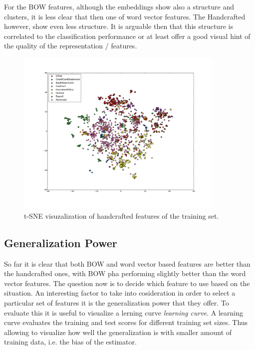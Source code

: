For the \ac{BOW} features, although the embeddings show also a  structure
and clusters, it  is less clear that then one of word vector features. The
Handcrafted however, show even less structure. It is arguable then that this
structure is correlated to the classification performance or at least offer a
good visual hint of the quality of the representation / features. 


\begin{figure}[ht!]
	\begin{center}

			\includegraphics[width=10cm]{images/tse-handcrafted-vectors.pdf} 

	\end{center}
        \caption{\ac{t-SNE} visuzalization of handcrafted features of the training set.}
	\label{fig:tsne_viz_3}
\end{figure}
 

\subsection{Generalization Power}
\label{sec:sub_w2v4tc_gen_power}

So far it is clear that both \ac{BOW} and word vector based features are
better than the handcrafted ones, with \ac{BOW}  pha performing slightly
better than the word vector features. The question now is to decide which
feature to use based on the situation. An interesting factor to take into
cosideration in order to select a particular set of features it is the
generalization power that they offer.  To evaluate this it is useful to
visualize a lerning curve \textit{learning curve}. A learning curve evaluates
the training and test scores for different training set sizes. Thus allowing
to visualize how well the generalization is with smaller amount of training
data, i.e. the bias of the estimator.


